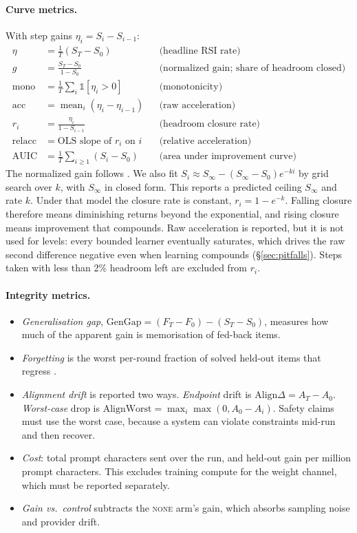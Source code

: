 \documentclass[11pt]{article}
\begin{document}
\paragraph{Curve metrics.} With step gains $\eta_i = S_i - S_{i-1}$:
\begin{align*}
\eta &= \tfrac{1}{T}(S_T - S_0) && \text{(headline RSI rate)}\\
g &= \frac{S_T - S_0}{1 - S_0} && \text{(normalized gain; share of headroom closed)}\\
\text{mono} &= \tfrac{1}{T}\textstyle\sum_i \mathbb{1}[\eta_i > 0] && \text{(monotonicity)}\\
\text{acc} &= \operatorname{mean}_i (\eta_i - \eta_{i-1}) && \text{(raw acceleration)}\\
r_i &= \frac{\eta_i}{1 - S_{i-1}} && \text{(headroom closure rate)}\\
\text{relacc} &= \text{OLS slope of } r_i \text{ on } i && \text{(relative acceleration)}\\
\text{AUIC} &= \tfrac{1}{T}\textstyle\sum_{i\ge1}(S_i - S_0) && \text{(area under improvement curve)}
\end{align*}
The normalized gain follows \citet{hake1998}. We also fit $S_i \approx S_\infty - (S_\infty - S_0)e^{-ki}$ by grid search over $k$, with $S_\infty$ in closed form. This reports a predicted ceiling $S_\infty$ and rate $k$. Under that model the closure rate is constant, $r_i = 1 - e^{-k}$. Falling closure therefore means diminishing returns beyond the exponential, and rising closure means improvement that compounds. Raw acceleration is reported, but it is not used for levels: every bounded learner eventually saturates, which drives the raw second difference negative even when learning compounds (\S\ref{sec:pitfalls}). Steps taken with less than 2\% headroom left are excluded from $r_i$.

\paragraph{Integrity metrics.}
\begin{itemize}
  \item \emph{Generalisation gap}, $\text{GenGap} = (F_T - F_0) - (S_T - S_0)$, measures how much of the apparent gain is memorisation of fed-back items.
  \item \emph{Forgetting} is the worst per-round fraction of solved held-out items that regress \citep[cf.][]{kirkpatrick2017}.
  \item \emph{Alignment drift} is reported two ways. \emph{Endpoint} drift is $\text{Align}\Delta = A_T - A_0$. \emph{Worst-case} drop is $\text{AlignWorst} = \max_i \max(0, A_0 - A_i)$. Safety claims must use the worst case, because a system can violate constraints mid-run and then recover.
  \item \emph{Cost}: total prompt characters sent over the run, and held-out gain per million prompt characters. This excludes training compute for the weight channel, which must be reported separately.
  \item \emph{Gain vs.\ control} subtracts the \textsc{none} arm's gain, which absorbs sampling noise and provider drift.
\end{itemize}
\end{document}
